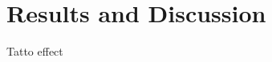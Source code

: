 
\chapter{Results and Discussion}\label{Results and Discussion}




Tatto effect
\parencite{tatto}

 
